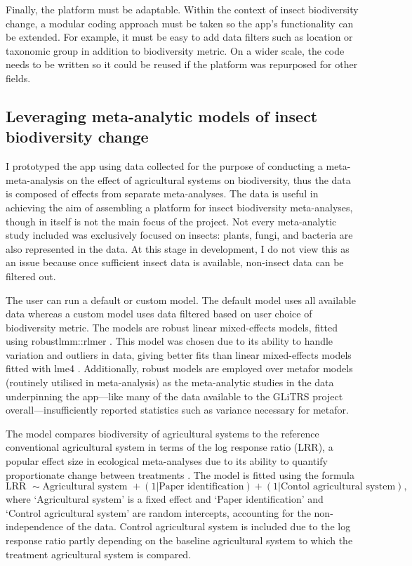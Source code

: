 \documentclass[11pt]{article}
\begin{document}
			\noindent Finally, the platform must be adaptable. Within the context of insect biodiversity change, a modular coding approach must be taken so the app’s functionality can be extended. For example, it must be easy to add data filters such as location or taxonomic group in addition to biodiversity metric. On a wider scale, the code needs to be written so it could be reused if the platform was repurposed for other fields.   
	
		\subsection{Leveraging meta-analytic models of insect biodiversity change}     
			I prototyped the app using data collected for the purpose of conducting a meta-meta-analysis on the effect of agricultural systems on biodiversity, thus the data is composed of effects from separate meta-analyses. The data is useful in achieving the aim of assembling a platform for insect biodiversity meta-analyses, though in itself is not the main focus of the project. Not every meta-analytic study included was exclusively focused on insects: plants, fungi, and bacteria are also represented in the data. At this stage in development, I do not view this as an issue because once sufficient insect data is available, non-insect data can be filtered out.
		
			\noindent The user can run a default or custom model. The default model uses all available data whereas a custom model uses data filtered based on user choice of biodiversity metric. The models are robust linear mixed-effects models, fitted using robustlmm::rlmer \parencite{koller2016robustlmm}. This model was chosen due to its ability to handle variation and outliers in data, giving better fits than linear mixed-effects models fitted with lme4 \parencite{bates2014fitting}. Additionally, robust models are employed over metafor models \parencite{viechtbauer2010conducting} (routinely utilised in meta-analysis) as the meta-analytic studies in the data underpinning the app—like many of the data available to the GLiTRS project overall—insufficiently reported statistics such as variance necessary for metafor.
		
			\noindent The model compares biodiversity of agricultural systems to the reference conventional agricultural system in terms of the log response ratio (LRR), a popular effect size in ecological meta-analyses due to its ability to quantify proportionate change between treatments \parencite{hedges1999meta}. The model is fitted using the formula
			\begin{equation}
				\mbox{LRR } \sim \mbox{Agricultural system } + (1|\mbox{Paper identification}) + (1|\mbox{Contol agricultural system}),
			\end{equation}
			\noindent where ‘Agricultural system’ is a fixed effect and ‘Paper identification’ and ‘Control agricultural system’ are random intercepts, accounting for the non-independence of the data. Control agricultural system is included due to the log response ratio partly depending on the baseline agricultural system to which the treatment agricultural system is compared. 
		
\end{document}
